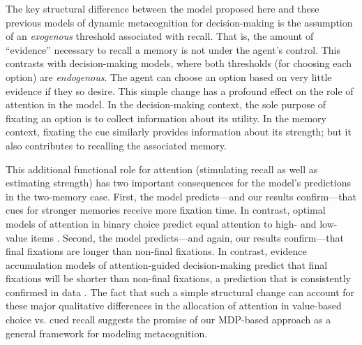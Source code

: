 The key structural difference between the model proposed here and these previous models of dynamic metacognition for decision-making is the assumption of an \emph{exogenous} threshold associated with recall. That is, the amount of ``evidence'' necessary to recall a memory is not under the agent's control. This contrasts with decision-making models, where both thresholds (for choosing each option) are \emph{endogenous}. The agent can choose an option based on very little evidence if they so desire. This simple change has a profound effect on the role of attention in the model. In the decision-making context, the sole purpose of fixating an option is to collect information about its utility. In the memory context, fixating the cue similarly provides information about its strength; but it also contributes to recalling the associated memory. 

This additional functional role for attention (stimulating recall as well as estimating strength) has two important consequences for the model's predictions in the two-memory case. First, the model predicts---and our results confirm---that cues for stronger memories receive more fixation time. In contrast, optimal models of attention in binary choice predict equal attention to high- and low-value items \citep{callaway2021fixation,jang2021optimal,fudenberg2018speed}.
Second, the model predicts---and again, our results confirm---that final fixations are longer than non-final fixations. In contrast, evidence accumulation models of attention-guided decision-making predict that final fixations will be shorter than non-final fixations, a prediction that is consistently confirmed in data \citep{krajbich2010visual,krajbich2011multialternative,tavares2017attentional}. The fact that such a simple structural change can account for these major qualitative differences in the allocation of attention in value-based choice vs. cued recall suggests the promise of our MDP-based approach as a general framework for modeling metacognition.

